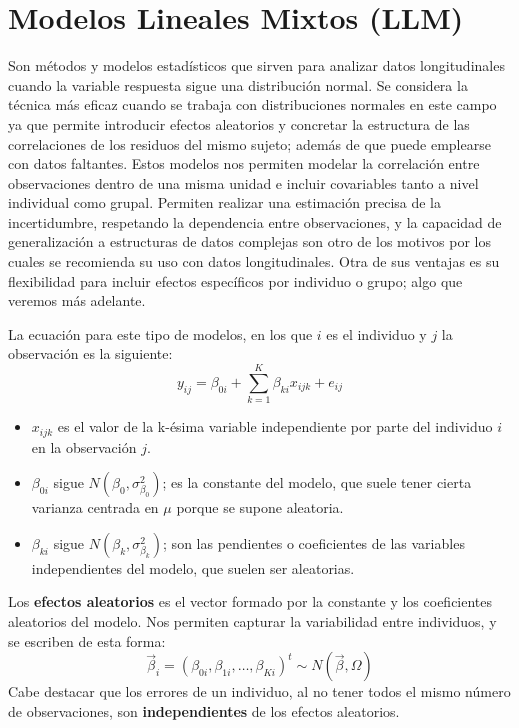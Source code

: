 \documentclass[
  letterpaper,
  DIV=11,
  numbers=noendperiod]{scrreprt}
\begin{document}
\section{Modelos Lineales Mixtos
(LLM)}\label{modelos-lineales-mixtos-llm}

Son métodos y modelos estadísticos que sirven para analizar datos
longitudinales cuando la variable respuesta sigue una distribución
normal. Se considera la técnica más eficaz cuando se trabaja con
distribuciones normales en este campo ya que permite introducir efectos
aleatorios y concretar la estructura de las correlaciones de los
residuos del mismo sujeto; además de que puede emplearse con datos
faltantes. Estos modelos nos permiten modelar la correlación entre
observaciones dentro de una misma unidad e incluir covariables tanto a
nivel individual como grupal. Permiten realizar una estimación precisa
de la incertidumbre, respetando la dependencia entre observaciones, y la
capacidad de generalización a estructuras de datos complejas son otro de
los motivos por los cuales se recomienda su uso con datos
longitudinales. Otra de sus ventajas es su flexibilidad para incluir
efectos específicos por individuo o grupo; algo que veremos más
adelante.

La ecuación para este tipo de modelos, en los que \(i\) es el individuo
y \(j\) la observación es la siguiente: \[
y_{ij} = \beta_{0i} + \sum_{k=1}^{K} \beta_{ki}x_{ijk} + e_{ij} 
\]

\begin{itemize}
\item
  \(x_{ijk}\) es el valor de la k-ésima variable independiente por parte
  del individuo \(i\) en la observación \(j\).
\item
  \(\beta_{0i}\) sigue \(N(\beta_{0}, \sigma^2_{\beta_{0}})\); es la
  constante del modelo, que suele tener cierta varianza centrada en
  \(\mu\) porque se supone aleatoria.
\item
  \(\beta_{ki}\) sigue \(N(\beta_{k}, \sigma^2_{\beta_{k}})\); son las
  pendientes o coeficientes de las variables independientes del modelo,
  que suelen ser aleatorias.
\end{itemize}

Los \textbf{efectos aleatorios} es el vector formado por la constante y
los coeficientes aleatorios del modelo. Nos permiten capturar la
variabilidad entre individuos, y se escriben de esta forma: \[
\vec{\beta}_i = (\beta_{0i}, \beta_{1i}, \ldots, \beta_{Ki})^t \sim N(\vec{\beta}, \Omega)
\] Cabe destacar que los errores de un individuo, al no tener todos el
mismo número de observaciones, son \textbf{independientes} de los
efectos aleatorios.
\end{document}

